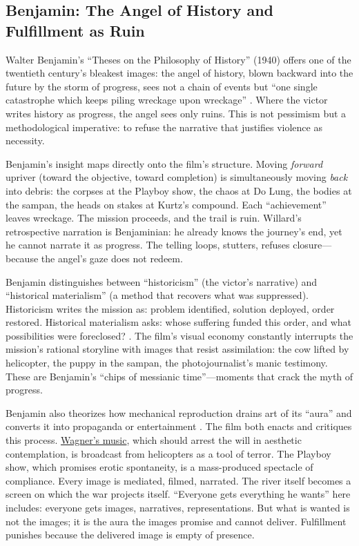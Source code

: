 \subsection*{Benjamin: The Angel of History and Fulfillment as Ruin}
\label{ssec:v-benjamin}
Walter Benjamin's ``Theses on the Philosophy of History'' (1940) offers one of the twentieth
century's bleakest images: the angel of history, blown backward into the future by the storm
of progress, sees not a chain of events but ``one single catastrophe which keeps piling
wreckage upon wreckage'' \parencite{BenjaminTheses1969}. Where the victor writes history as
progress, the angel sees only ruins. This is not pessimism but a methodological imperative: to
refuse the narrative that justifies violence as necessity.

Benjamin's insight maps directly onto the film's structure. Moving \emph{forward} upriver
(toward the objective, toward completion) is simultaneously moving \emph{back} into debris:
the corpses at the Playboy show, the chaos at Do Lung, the bodies at the sampan, the heads on
stakes at Kurtz's compound. Each ``achievement'' leaves wreckage. The mission proceeds, and
the trail is ruin. Willard's retrospective narration is Benjaminian: he already knows the
journey's end, yet he cannot narrate it as progress. The telling loops, stutters, refuses
closure---because the angel's gaze does not redeem.

Benjamin distinguishes between ``historicism'' (the victor's narrative) and ``historical
materialism'' (a method that recovers what was suppressed). Historicism writes the mission as:
problem identified, solution deployed, order restored. Historical materialism asks: whose
suffering funded this order, and what possibilities were foreclosed?
\parencite{BenjaminTheses1969}. The film's visual economy constantly interrupts the mission's
rational storyline with images that resist assimilation: the cow lifted by helicopter, the
puppy in the sampan, the photojournalist's manic testimony. These are Benjamin's ``chips of
messianic time''---moments that crack the myth of progress.

Benjamin also theorizes how mechanical reproduction drains art of its ``aura'' and converts it
into propaganda or entertainment \parencite{BenjaminArtwork1969}. The film both enacts and
critiques this process. \hyperref[scene:kilgore-beach]{Wagner's music}, which should arrest the
will in aesthetic contemplation, is broadcast from helicopters as a tool of terror. The
Playboy show, which
promises erotic spontaneity, is a mass-produced spectacle of compliance. Every image is
mediated, filmed, narrated. The river itself becomes a screen on which the war projects itself.
``Everyone gets everything he wants'' here includes: everyone gets images, narratives,
representations. But what is wanted is not the images; it is the aura the images promise and
cannot deliver. Fulfillment punishes because the delivered image is empty of presence.

